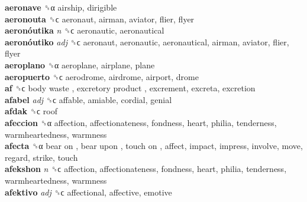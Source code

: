\textbf{aeronave} ␝α  airship, dirigible  \\
\textbf{aeronouta} ␝ϲ  aeronaut, airman, aviator, flier, flyer  \\
\textbf{aeronóutika} \emph{n}  ␝ϲ  aeronautic, aeronautical  \\
\textbf{aeronóutiko} \emph{adj}  ␝ϲ  aeronaut, aeronautic, aeronautical, airman, aviator, flier, flyer  \\
\textbf{aeroplano} ␝α  aeroplane, airplane, plane  \\
\textbf{aeropuerto} ␝ϲ  aerodrome, airdrome, airport, drome  \\
\textbf{af} ␝ϲ   body waste ,  excretory product , excrement, excreta, excretion  \\
\textbf{afabel} \emph{adj}  ␝ϲ  affable, amiable, cordial, genial  \\
\textbf{afdak} ␝ϲ  roof  \\
\textbf{afeccion} ␝α  affection, affectionateness, fondness, heart, philia, tenderness, warmheartedness, warmness  \\
\textbf{afecta} ␝α   bear on ,  bear upon ,  touch on , affect, impact, impress, involve, move, regard, strike, touch  \\
\textbf{afekshon} \emph{n}  ␝ϲ  affection, affectionateness, fondness, heart, philia, tenderness, warmheartedness, warmness  \\
\textbf{afektivo} \emph{adj}  ␝ϲ  affectional, affective, emotive  \\
